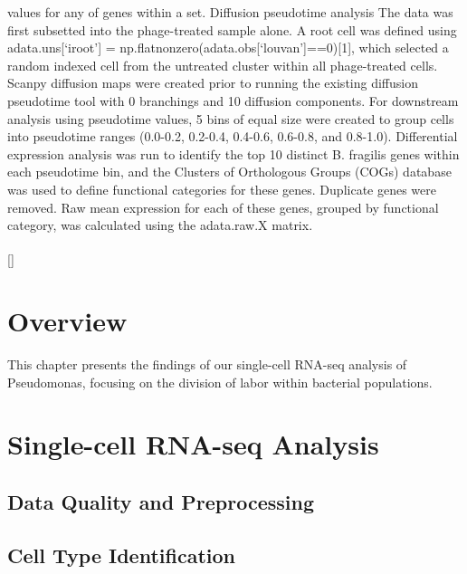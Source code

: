 \documentclass[
  11pt,
  a4paper,
]{report}
\begin{document}
values for any of genes within a set. Diffusion pseudotime analysis The
data was first subsetted into the phage-treated sample alone. A root
cell was defined using adata.uns{[}`iroot'{]} =
np.flatnonzero(adata.obs{[}`louvan'{]}==0){[}1{]}, which selected a
random indexed cell from the untreated cluster within all phage-treated
cells. Scanpy diffusion maps were created prior to running the existing
diffusion pseudotime tool with 0 branchings and 10 diffusion components.
For downstream analysis using pseudotime values, 5 bins of equal size
were created to group cells into pseudotime ranges (0.0-0.2, 0.2-0.4,
0.4-0.6, 0.6-0.8, and 0.8-1.0). Differential expression analysis was run
to identify the top 10 distinct B. fragilis genes within each pseudotime
bin, and the Clusters of Orthologous Groups (COGs) database was used to
define functional categories for these genes. Duplicate genes were
removed. Raw mean expression for each of these genes, grouped by
functional category, was calculated using the adata.raw.X matrix.

{[}\textsuperscript{}{]}\textsuperscript{}\textsuperscript{}\textsuperscript{}

\textsuperscript{}

\section{Overview}\label{overview}

This chapter presents the findings of our single-cell RNA-seq analysis
of Pseudomonas, focusing on the division of labor within bacterial
populations.

\section{Single-cell RNA-seq
Analysis}\label{single-cell-rna-seq-analysis}

\subsection{Data Quality and
Preprocessing}\label{data-quality-and-preprocessing}

\subsection{Cell Type Identification}\label{cell-type-identification}
\end{document}
